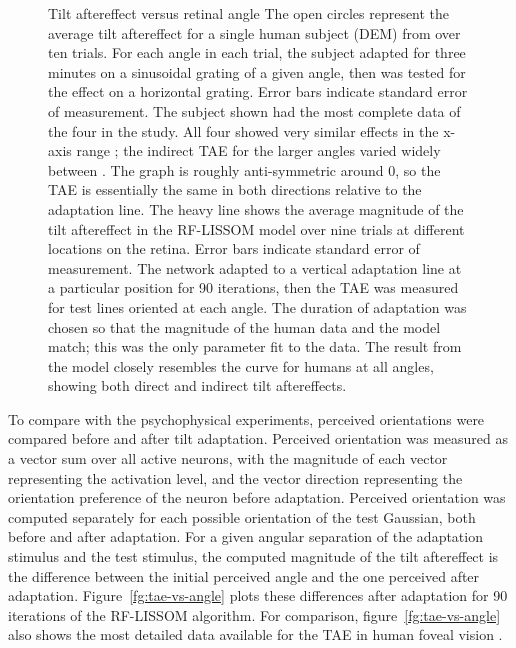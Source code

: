 \documentclass[10pt]{article}   %
\begin{document}
\begin{figure}
  \centering
  {Tilt aftereffect versus retinal angle}
  {The open circles represent the average tilt aftereffect for a
    single human subject (DEM) from  over ten
    trials.  For each angle in each trial, the subject adapted for
    three minutes on a sinusoidal grating of a given angle, then was
    tested for the effect on a horizontal grating. Error bars indicate
     standard error of measurement.  The subject shown had the
    most complete data of the four in the study.  All four showed very
    similar effects in the x-axis range \degree; the
    indirect TAE for the larger angles varied widely between
    \degree.  The graph is roughly anti-symmetric around
    0\degree, so the TAE is essentially the same in both directions
    relative to the adaptation line. 
    The heavy line shows the average magnitude of the tilt aftereffect
    in the RF-LISSOM model over nine trials at different locations on
    the retina.  Error bars indicate  standard error of
    measurement.  The network adapted to a vertical adaptation line at
    a particular position for 90 iterations, then the TAE was measured
    for test lines oriented at each angle.  The duration of adaptation
    was chosen so that the magnitude of the human data and the model
    match; this was the only parameter fit to the data.  
    The result from the model
    closely resembles the curve for humans at all angles, showing both
    direct and indirect tilt aftereffects.
    }
\end{figure}

To compare with the psychophysical experiments, perceived
orientations were compared before and after tilt adaptation.
Perceived orientation was measured as a vector sum over all active
neurons, with the magnitude of each vector representing the activation
level, and the vector direction representing the orientation
preference of the neuron before adaptation.  Perceived orientation was
computed separately for each possible orientation of the test
Gaussian, both before and after adaptation.  For a given angular
separation of the adaptation stimulus and the test stimulus, the
computed magnitude of the tilt aftereffect is the difference between
the initial perceived angle and the one perceived after adaptation.
Figure~\ref{fg:tae-vs-angle} plots these differences after adaptation
for 90 iterations of the RF-LISSOM algorithm.  For comparison,
figure~\ref{fg:tae-vs-angle} also shows the most detailed data
available for the TAE in human foveal vision \cite{mitchell:vres76}.
\end{document}
